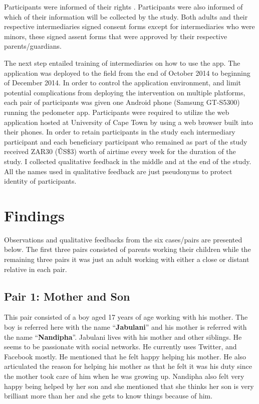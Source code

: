 Participants were informed of their rights . Participants were also informed of which of their information will be collected by the study. Both adults and their respective intermediaries signed consent forms except for intermediaries who were minors, these signed assent forms that were approved by their respective parents/guardians. 

The next step entailed training of intermediaries on how to use the app. The application was deployed to the field from the end of October 2014 to beginning of December 2014. In order to control the application environment, and limit potential complications from deploying the intervention on multiple platforms, each pair of participants was given one Android phone (Samsung GT-S5300) running the pedometer app. Participants were required to utilize the web application hosted at University of Cape Town by using a web browser built into their phones. In order to retain participants in the study each intermediary participant and each beneficiary participant who remained as part of the study received ZAR30 (\~US\$3) worth of airtime every week for the duration of the study. I collected qualitative feedback in the middle and at the end of the study. All the names used in qualitative feedback are just pseudonyms to protect identity of participants.
\section{Findings}
Observations and qualitative feedbacks from the six cases/pairs are presented below. The first three pairs consisted of parents working their children while the remaining three pairs it was just an adult working with either a close or distant relative in each pair.
\subsection*{\textbf{Pair 1: Mother and Son}}
This pair consisted of a boy aged 17 years of age working with his mother. The boy is referred here with the name ``\textbf{Jabulani}'' and his mother is referred with the name ``\textbf{Nandipha}''. Jabulani lives with his mother and other siblings. He seems to be passionate with social networks. He currently uses Twitter, and Facebook mostly. He mentioned that he felt happy helping his mother. He also articulated the reason for helping his mother as that he felt it was his duty since the mother took care of him when he was growing up. Nandipha also felt very happy being helped by her son and she mentioned that she thinks her son is very brilliant more than her and she gets to know things because of him. 


